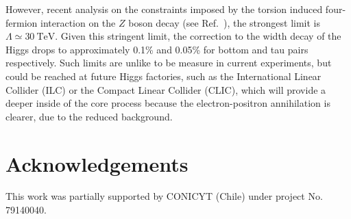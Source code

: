 \documentclass{ws-mpla}
\renewcommand{\(}{\left(}
\renewcommand{\)}{\right)}
\renewcommand{\[}{\left[}
\renewcommand{\]}{\right]}
\begin{document}
However, recent analysis on the constraints imposed by the torsion induced four-fermion interaction on the $Z$ boson decay (see Ref.~), the strongest limit is $\Lambda \simeq \SI{30}{\TeV}$. Given this stringent limit, the correction to the width decay of the Higgs drops to approximately \num{.1}\% and \num{.05}\% for bottom and tau pairs respectively. Such limits are unlike to be measure in current experiments, but could be reached at future Higgs factories, such as the International Linear Collider (ILC) or the Compact Linear Collider (CLIC), which will provide a deeper inside of the core process because the electron-positron annihilation is clearer, due to the reduced background.

\section*{Acknowledgements}

This work was partially supported by CONICYT (Chile) under project No. 79140040.




\end{document}
